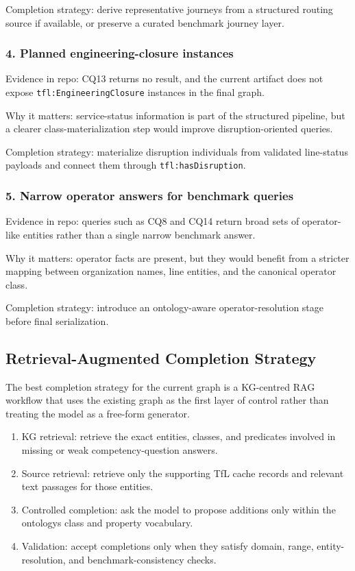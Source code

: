 \documentclass[
  11pt,
  a4paper,
]{article}
\providecommand{\tightlist}{%
  \setlength{\itemsep}{0pt}\setlength{\parskip}{0pt}}
\begin{document}
Completion strategy: derive representative journeys from a structured
routing source if available, or preserve a curated benchmark journey
layer.

\subsubsection{4. Planned engineering-closure
instances}\label{4-planned-engineering-closure-instances}

Evidence in repo: CQ13 returns no result, and the current artifact does
not expose \texttt{tfl:EngineeringClosure} instances in the final graph.

Why it matters: service-status information is part of the structured
pipeline, but a clearer class-materialization step would improve
disruption-oriented queries.

Completion strategy: materialize disruption individuals from validated
line-status payloads and connect them through
\texttt{tfl:hasDisruption}.

\subsubsection{5. Narrow operator answers for benchmark
queries}\label{5-narrow-operator-answers-for-benchmark-queries}

Evidence in repo: queries such as CQ8 and CQ14 return broad sets of
operator-like entities rather than a single narrow benchmark answer.

Why it matters: operator facts are present, but they would benefit from
a stricter mapping between organization names, line entities, and the
canonical operator class.

Completion strategy: introduce an ontology-aware operator-resolution
stage before final serialization.

\subsection{Retrieval-Augmented Completion
Strategy}\label{retrieval-augmented-completion-strategy}

The best completion strategy for the current graph is a KG-centred RAG
workflow that uses the existing graph as the first layer of control
rather than treating the model as a free-form generator.

\begin{enumerate}
\def\labelenumi{\arabic{enumi}.}
\tightlist
\item
  KG retrieval: retrieve the exact entities, classes, and predicates
  involved in missing or weak competency-question answers.
\item
  Source retrieval: retrieve only the supporting TfL cache records and
  relevant text passages for those entities.
\item
  Controlled completion: ask the model to propose additions only within
  the ontology\textquotesingle s class and property vocabulary.
\item
  Validation: accept completions only when they satisfy domain, range,
  entity-resolution, and benchmark-consistency checks.
\end{enumerate}
\end{document}

